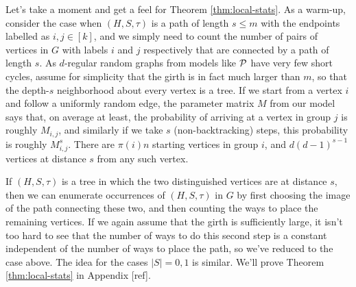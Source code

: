 Let's take a moment and get a feel for Theorem \ref{thm:local-stats}. As a warm-up, consider the case when $(H,S,\tau)$ is a path of length $s \le m$ with the endpoints labelled as $i,j\in [k]$, and we simply need to count the number of pairs of vertices in $G$ with labels $i$ and $j$ respectively that are connected by a path of length $s$. As $d$-regular random graphs from models like $\mathcal{P}$ have very few short cycles, assume for simplicity that the girth is in fact much larger than $m$, so that the depth-$s$ neighborhood about every vertex is a tree. If we start from a vertex $i$ and follow a uniformly random edge, the parameter matrix $M$ from our model says that, on average at least, the probability of arriving at a vertex in group $j$ is roughly $M_{i,j}$, and similarly if we take $s$ (non-backtracking) steps, this probability is roughly $M^s_{i,j}$. There are $\pi(i) n$ starting vertices in group $i$, and $d(d-1)^{s-1}$ vertices at distance $s$ from any such vertex. 

If $(H,S,\tau)$ is a tree in which the two distinguished vertices are at distance $s$, then we can enumerate occurrences of $(H,S,\tau)$ in $G$ by first choosing the image of the path connecting these two, and then counting the ways to place the remaining vertices. If we again assume that the girth is sufficiently large, it isn't too hard to see that the number of ways to do this second step is a constant independent of the number of ways to place the path, so we've reduced to the case above. The idea for the cases $|S| = 0,1$ is similar. We'll prove Theorem \ref{thm:local-stats} in Appendix [ref].





